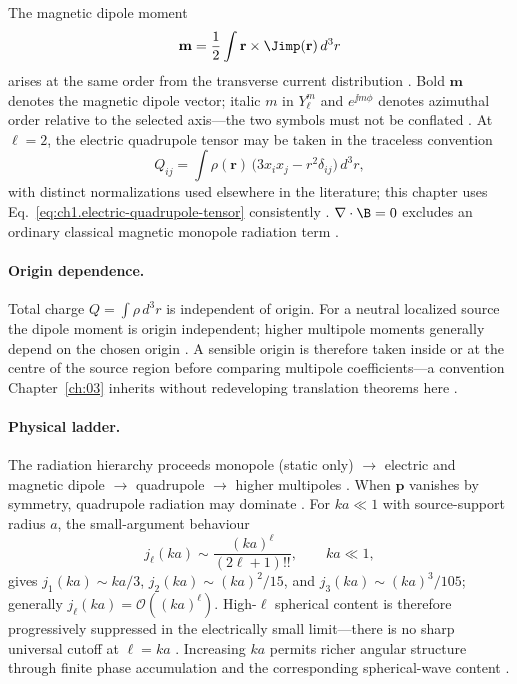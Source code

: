The magnetic dipole moment
\begin{equation}
\label{eq:ch1.magnetic-dipole-moment}
\mathbf{m}=\frac{1}{2}\int \mathbf{r}\times\Jimp(\mathbf{r})\,d^3r
\end{equation}
arises at the same order from the transverse current distribution \cite{stratton1941,jackson1999}. Bold $\mathbf{m}$ denotes the magnetic dipole vector; italic $m$ in $Y_\ell^m$ and $e^{\jj m\phi}$ denotes azimuthal order relative to the selected axis---the two symbols must not be conflated \cite{stratton1941}. At $\ell=2$, the electric quadrupole tensor may be taken in the traceless convention
\begin{equation}
\label{eq:ch1.electric-quadrupole-tensor}
Q_{ij}=\int \rho(\mathbf{r})\,\big(3x_i x_j-r^2\delta_{ij}\big)\,d^3r,
\end{equation}
with distinct normalizations used elsewhere in the literature; this chapter uses Eq.~\eqref{eq:ch1.electric-quadrupole-tensor} consistently \cite{jackson1999,stratton1941}. $\nabla\cdot\B=0$ excludes an ordinary classical magnetic monopole radiation term \cite{maxwell1873}.

\paragraph{Origin dependence.}
Total charge $Q=\int\rho\,d^3r$ is independent of origin. For a neutral localized source the dipole moment is origin independent; higher multipole moments generally depend on the chosen origin \cite{jackson1999,stratton1941}. A sensible origin is therefore taken inside or at the centre of the source region before comparing multipole coefficients---a convention Chapter~\ref{ch:03} inherits without redeveloping translation theorems here \cite{stratton1941}.

\paragraph{Physical ladder.}
The radiation hierarchy proceeds monopole (static only) $\rightarrow$ electric and magnetic dipole $\rightarrow$ quadrupole $\rightarrow$ higher multipoles \cite{stratton1941,jackson1999}. When $\mathbf{p}$ vanishes by symmetry, quadrupole radiation may dominate \cite{stratton1941,harrington2001}. For $ka\ll 1$ with source-support radius $a$, the small-argument behaviour
\begin{equation}
\label{eq:ch1.small-ka-bessel}
j_\ell(ka)\sim\frac{(ka)^\ell}{(2\ell+1)!!},
\qquad ka\ll 1,
\end{equation}
gives $j_1(ka)\sim ka/3$, $j_2(ka)\sim (ka)^2/15$, and $j_3(ka)\sim (ka)^3/105$; generally $j_\ell(ka)=\mathcal{O}((ka)^\ell)$. High-$\ell$ spherical content is therefore progressively suppressed in the electrically small limit---there is no sharp universal cutoff at $\ell=ka$ \cite{stratton1941,chu1948}. Increasing $ka$ permits richer angular structure through finite phase accumulation and the corresponding spherical-wave content \cite{stratton1941}.

